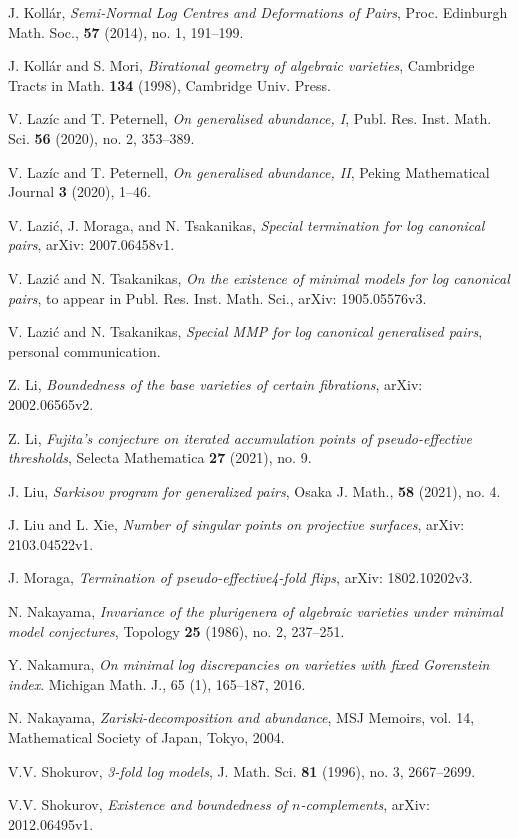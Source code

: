 \documentclass[11pt]{amsart}
\numberwithin{equation}{section}
\theoremstyle{definition}
\theoremstyle{definition}
\theoremstyle{definition}
\begin{document}
\begin{thebibliography}{99}
 J. Koll\'ar, \textit{Semi-Normal Log Centres and Deformations of Pairs}, Proc. Edinburgh Math. Soc., \textbf{57} (2014), no. 1, 191--199.

 J. Koll\'{a}r and S. Mori, \textit{Birational geometry of algebraic varieties}, Cambridge Tracts in Math. \textbf{134} (1998), Cambridge Univ. Press.

 V. Laz\'ic and T. Peternell, \textit{On generalised abundance, I}, Publ. Res. Inst. Math. Sci. \textbf{56} (2020), no. 2, 353--389.

 V. Laz\'ic and T. Peternell, \textit{On generalised abundance, II}, Peking Mathematical Journal \textbf{3} (2020), 1--46.

 V. Lazi\'c, J. Moraga, and N. Tsakanikas, \textit{Special termination for log canonical pairs}, arXiv: 2007.06458v1.

 V. Lazi\'c and N. Tsakanikas, \textit{On the existence of minimal models for log canonical pairs}, to appear in Publ. Res. Inst. Math. Sci., arXiv: 1905.05576v3.

 V. Lazi\'c and N. Tsakanikas, \textit{Special MMP for log canonical generalised pairs}, personal communication.

 Z. Li, \textit{Boundedness of the base varieties of certain fibrations}, arXiv: 2002.06565v2.

 Z. Li, \textit{Fujita’s conjecture on iterated accumulation points of pseudo-effective thresholds}, Selecta Mathematica \textbf{27} (2021), no. 9.

 J. Liu, \textit{Sarkisov program for generalized pairs}, Osaka J. Math., \textbf{58} (2021), no. 4.

 J. Liu and L. Xie, \textit{Number of singular points on projective surfaces}, arXiv: 2103.04522v1.

 J. Moraga, \textit{Termination of pseudo-effective4-fold flips}, arXiv: 1802.10202v3.

 N. Nakayama, \textit{Invariance of the plurigenera of algebraic varieties under minimal model conjectures}, Topology \textbf{25} (1986), no. 2, 237--251.

 Y. Nakamura, \textit{On minimal log discrepancies on varieties with fixed Gorenstein index}. Michigan Math. J., 65 (1), 165--187, 2016.

 N. Nakayama, \textit{Zariski-decomposition and abundance}, MSJ Memoirs, vol. 14, Mathematical Society of Japan, Tokyo, 2004.

 V.V. Shokurov, \textit{3-fold log models}, J. Math. Sci. \textbf{81} (1996), no. 3, 2667--2699.

 V.V. Shokurov, \textit{Existence and boundedness of $n$-complements}, arXiv: 2012.06495v1.

\end{thebibliography}












    
\end{document}
